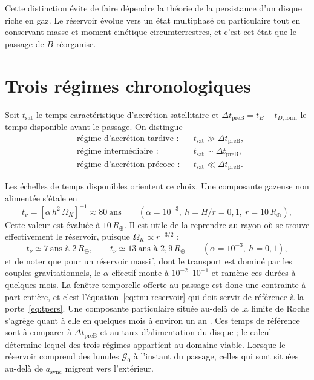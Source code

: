 \documentclass[11pt,a4paper,openany]{report}
\newcommand{\Rt}{R_{\oplus}}
\begin{document}
\begin{lecture}
Cette distinction évite de faire dépendre la théorie de la persistance d'un disque riche en gaz.
Le réservoir évolue vers un état multiphasé ou particulaire tout en conservant masse et moment
cinétique circumterrestres, et c'est cet état que le passage de $B$ réorganise.
\end{lecture}


\section{Trois régimes chronologiques}
\label{sec:regimes}

Soit $t_{\mathrm{sat}}$ le temps caractéristique d'accrétion satellitaire et
$\Delta t_{\mathrm{preB}}=t_B-t_{D,\mathrm{form}}$ le temps disponible avant le passage. On
distingue
\begin{align}
&\text{régime d'accrétion tardive :} && t_{\mathrm{sat}}\gg\Delta t_{\mathrm{preB}},
\label{eq:tardif}\\
&\text{régime intermédiaire :} && t_{\mathrm{sat}}\sim\Delta t_{\mathrm{preB}},
\label{eq:interm}\\
&\text{régime d'accrétion précoce :} && t_{\mathrm{sat}}\ll\Delta t_{\mathrm{preB}}.
\label{eq:precoce}
\end{align}

Les échelles de temps disponibles orientent ce choix. Une composante gazeuse non alimentée
s'étale en
\begin{equation}
t_\nu=\left[\alpha\,h^2\,\Omega_K\right]^{-1}\approx80\ \text{ans}
\qquad(\alpha=10^{-3},\ h=H/r=0{,}1,\ r=10\,\Rt),
\label{eq:tnu-num}
\end{equation}
Cette valeur est évaluée à $10\,\Rt$. Il est utile de la reprendre au rayon où se trouve
effectivement le réservoir, puisque $\Omega_K\propto r^{-3/2}$ :
\begin{equation}
t_\nu\simeq7\ \text{ans à }2\,\Rt,\qquad t_\nu\simeq13\ \text{ans à }2{,}9\,\Rt
\qquad(\alpha=10^{-3},\ h=0{,}1),
\label{eq:tnu-reservoir}
\end{equation}
et de noter que pour un réservoir massif, dont le transport est dominé par les couples
gravitationnels, le $\alpha$ effectif monte à $10^{-2}$--$10^{-1}$ et ramène ces durées à quelques
mois. La fenêtre temporelle offerte au passage est donc une contrainte à part entière, et c'est
l'équation~\eqref{eq:tnu-reservoir} qui doit servir de référence à la
porte~\eqref{eq:tpers}.
Une composante particulaire située au-delà de la limite de Roche s'agrège quant à elle en quelques
mois à environ un an \cite{Ida1997,Kokubo2000}. Ces temps de référence sont à comparer à
$\Delta t_{\mathrm{preB}}$ et au taux d'alimentation du disque ; le calcul détermine lequel des trois
régimes appartient au domaine viable. Lorsque le réservoir comprend des lunules
$\mathcal{G}_0$ à l'instant du passage, celles qui sont situées au-delà de $a_{\mathrm{sync}}$ migrent
vers l'extérieur.
\end{document}
